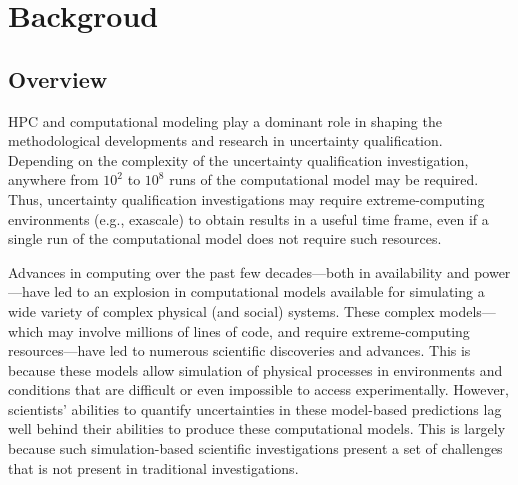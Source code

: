 

\chapter{Backgroud}\label{cap_backgroud}

\section{Overview}

HPC and computational modeling play a dominant role in shaping the methodological developments and research in uncertainty qualification. Depending on the complexity of the uncertainty qualification investigation, anywhere from $10^{2}$ to $10^{8}$ runs of the computational model may be required. Thus, uncertainty qualification investigations may require extreme-computing environments (e.g., exascale) to obtain results in a useful time frame, even if a single run of the computational model does not require such resources. 

Advances in computing over the past few decades—both in availability and power—have led to an explosion in computational models available for simulating a wide variety of complex physical (and social) systems. These complex models—which may involve millions of lines of code, and require extreme-computing resources—have led to numerous scientific discoveries and advances. This is because these models allow simulation of physical processes in environments and conditions that are difficult or even impossible to access experimentally. However, scientists’ abilities to quantify uncertainties in these model-based predictions lag well behind their abilities to produce these computational models. This is largely because such simulation-based scientific investigations present a set of challenges that is not present in traditional investigations.

